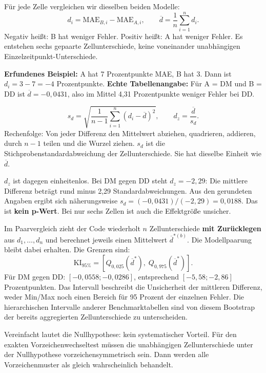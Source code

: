 Für jede Zelle vergleichen wir dieselben beiden Modelle:
\[
d_i=\mathrm{MAE}_{B,i}-\mathrm{MAE}_{A,i},\qquad
\overline d=\frac1n\sum_{i=1}^{n}d_i.
\]
Negativ heißt: B hat weniger Fehler. Positiv heißt: A hat weniger Fehler. Es entstehen sechs gepaarte Zellunterschiede, keine voneinander unabhängigen Einzelzeitpunkt-Unterschiede.

\textbf{Erfundenes Beispiel:} A hat 7 Prozentpunkte MAE, B hat 3. Dann ist $d_i=3-7=-4$ Prozentpunkte. \textbf{Echte Tabellenangabe:} Für A = DM und B = DD ist $\overline d=-0{,}0431$, also im Mittel 4,31 Prozentpunkte weniger Fehler bei DD.

\[
s_d=\sqrt{\frac{1}{n-1}\sum_{i=1}^{n}(d_i-\overline d)^2},
\qquad \boxed{d_z=\frac{\overline d}{s_d}}.
\]
Rechenfolge: Von jeder Differenz den Mittelwert abziehen, quadrieren, addieren, durch $n-1$ teilen und die Wurzel ziehen. $s_d$ ist die Stichprobenstandardabweichung der Zellunterschiede. Sie hat dieselbe Einheit wie $\overline d$.

$d_z$ ist dagegen einheitenlos. Bei DM gegen DD steht $d_z=-2{,}29$: Die mittlere Differenz beträgt rund minus 2,29 Standardabweichungen. Aus den gerundeten Angaben ergibt sich näherungsweise $s_d=(-0{,}0431)/(-2{,}29)=0{,}0188$. Das ist \textbf{kein p-Wert}. Bei nur sechs Zellen ist auch die Effektgröße unsicher.

Im Paarvergleich zieht der Code wiederholt $n$ Zellunterschiede \textbf{mit Zurücklegen} aus $d_1,\ldots,d_n$ und berechnet jeweils einen Mittelwert $\overline d^{*(b)}$. Die Modellpaarung bleibt dabei erhalten. Die Grenzen sind:
\[
\mathrm{KI}_{95\%}=
\left[Q_{0{,}025}(\overline d^*),\;Q_{0{,}975}(\overline d^*)\right].
\]
Für DM gegen DD: $[-0{,}0558;-0{,}0286]$, entsprechend $[-5{,}58;-2{,}86]$ Prozentpunkten. Das Intervall beschreibt die Unsicherheit der mittleren Differenz, weder Min/Max noch einen Bereich für 95 Prozent der einzelnen Fehler. Die hierarchischen Intervalle anderer Benchmarktabellen sind von diesem Bootstrap der bereits aggregierten Zellunterschiede zu unterscheiden.

Vereinfacht lautet die Nullhypothese: kein systematischer Vorteil. Für den exakten Vorzeichenwechseltest müssen die unabhängigen Zellunterschiede unter der Nullhypothese vorzeichensymmetrisch sein. Dann werden alle Vorzeichenmuster als gleich wahrscheinlich behandelt.

